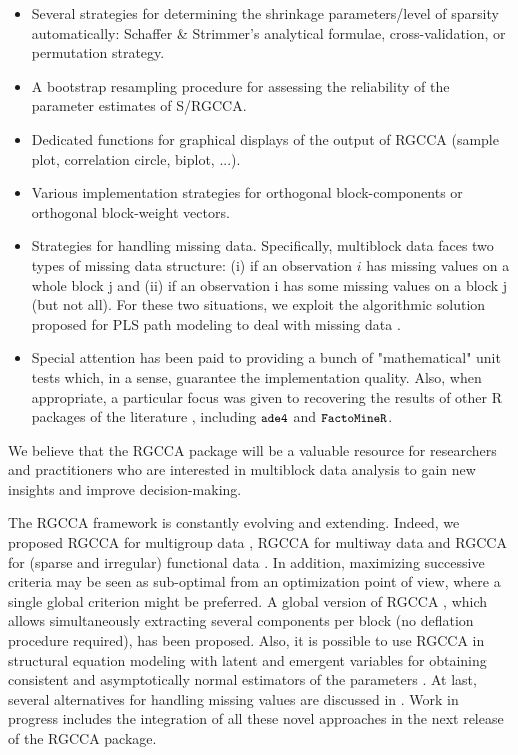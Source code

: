 \documentclass[
]{jss}
\begin{document}
\begin{itemize}
\item Several strategies for determining the shrinkage 
parameters/level of sparsity automatically: Schaffer \& Strimmer's analytical formulae, 
cross-validation, or permutation strategy.

\item A bootstrap resampling procedure for assessing the reliability of the 
parameter estimates of S/RGCCA.

\item Dedicated functions for graphical displays of the output of RGCCA 
(sample plot, correlation circle, biplot, ...).

\item Various implementation strategies for orthogonal block-components or 
orthogonal block-weight vectors.


\item Strategies for handling missing data. Specifically, multiblock data 
faces two types of missing data structure: (i) if an 
observation $i$ has missing values on a whole block j and (ii) if an 
observation i has some missing values on a block j (but not all). For these two 
situations, we exploit the algorithmic solution proposed for PLS 
path modeling to deal with missing data \citep[see][]{Tenenhaus2005}.

\item Special attention has been paid to providing a bunch of "mathematical" unit tests 
which, in a sense, guarantee the implementation quality. Also, when appropriate, a particular focus was given to recovering the results of other R packages of the literature , including $\small{\texttt{ade4}}$ and $\small{\texttt{FactoMineR}}$.
\end{itemize}

We believe that the RGCCA package will be a valuable resource for
researchers and practitioners who are interested in multiblock data
analysis to gain new insights and improve decision-making.

The RGCCA framework is constantly evolving and extending. Indeed, we
proposed RGCCA for multigroup data \citep{Tenenhaus2014b}, RGCCA for
multiway data \citep{Gloaguen2020, Girka2023} and RGCCA for (sparse and
irregular) functional data \citep{Sort2023}. In addition, maximizing
successive criteria may be seen as sub-optimal from an optimization
point of view, where a single global criterion might be preferred. A
global version of RGCCA \citep{Gloaguen2020b}, which allows
simultaneously extracting several components per block (no deflation
procedure required), has been proposed. Also, it is possible to use
RGCCA in structural equation modeling with latent and emergent variables
for obtaining consistent and asymptotically normal estimators of the
parameters \citep{Tenenhaus2023}. At last, several alternatives for
handling missing values are discussed in \cite{Peltier2022}. Work in
progress includes the integration of all these novel approaches in the
next release of the RGCCA package.
\end{document}
